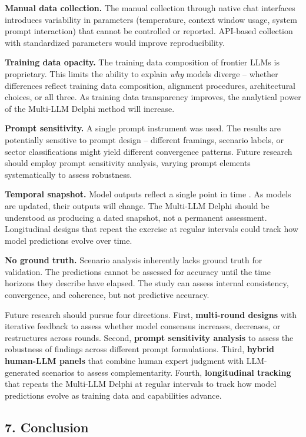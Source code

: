 \documentclass{article}
\begin{document}
\textbf{Manual data collection.} The manual collection through native chat interfaces introduces variability in parameters (temperature, context window usage, system prompt interaction) that cannot be controlled or reported. API-based collection with standardized parameters would improve reproducibility.

\textbf{Training data opacity.} The training data composition of frontier LLMs is proprietary. This limits the ability to explain \textit{why} models diverge -- whether differences reflect training data composition, alignment procedures, architectural choices, or all three. As training data transparency improves, the analytical power of the Multi-LLM Delphi method will increase.

\textbf{Prompt sensitivity.} A single prompt instrument was used. The results are potentially sensitive to prompt design -- different framings, scenario labels, or sector classifications might yield different convergence patterns. Future research should employ prompt sensitivity analysis, varying prompt elements systematically to assess robustness.

\textbf{Temporal snapshot.} Model outputs reflect a single point in time \citep{march2026}. As models are updated, their outputs will change. The Multi-LLM Delphi should be understood as producing a dated snapshot, not a permanent assessment. Longitudinal designs that repeat the exercise at regular intervals could track how model predictions evolve over time.

\textbf{No ground truth.} Scenario analysis inherently lacks ground truth for validation. The predictions cannot be assessed for accuracy until the time horizons they describe have elapsed. The study can assess internal consistency, convergence, and coherence, but not predictive accuracy.

Future research should pursue four directions. First, \textbf{multi-round designs} with iterative feedback to assess whether model consensus increases, decreases, or restructures across rounds. Second, \textbf{prompt sensitivity analysis} to assess the robustness of findings across different prompt formulations. Third, \textbf{hybrid human-LLM panels} that combine human expert judgment with LLM-generated scenarios to assess complementarity. Fourth, \textbf{longitudinal tracking} that repeats the Multi-LLM Delphi at regular intervals to track how model predictions evolve as training data and capabilities advance.



\subsection{7. Conclusion}
\label{sec:7_conclusion}
\end{document}
